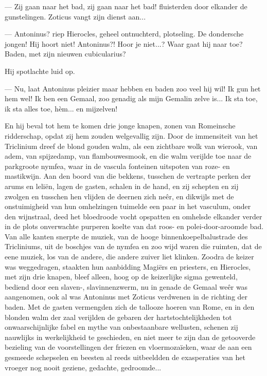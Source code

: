 \documentclass[a4paper, 12pt, oneside, dutch]{article}
\begin{document}
--- Zij gaan naar het bad, zij gaan naar het bad! fluisterden door elkander de gunstelingen. Zoticus vangt zijn dienst aan...

--- Antoninus? riep Hierocles, geheel ontnuchterd, plotseling. De dondersche jongen! Hij hoort niet! Antoninus?! Hoor je niet...? Waar gaat hij naar toe? Baden, met zijn nieuwen cubicularius?

Hij spotlachte luid op.

--- Nu, laat Antoninus pleizier maar hebben en baden zoo veel hij wil! Ik gun het hem wel! Ik ben een Gemaal, zoo genadig als mijn Gemalin zelve is... Ik sta toe, ik sta alles toe, hèm... en mijzelven!

En hij beval tot hem te komen drie jonge knapen, zonen van Romeinsche ridderschap, opdat zij hem zouden welgevallig zijn. Door de immensiteit van het Triclinium dreef de blond gouden walm, als een zichtbare wolk van wierook, van adem, van spijzedamp, van flambouwesmook, en die walm verijlde toe naar de parkgroote nymfea, waar in de vascula fonteinen uitspoten van roze- en mastikwijn. Aan den boord van die bekkens, tusschen de vertrapte perken der arums en leliën, lagen de gasten, schalen in de hand, en zij schepten en zij zwolgen en tusschen hen vlijden de deernen zich neêr, en dikwijls met de onstuimigheid van hun omhelzingen tuimelde een paar in het vasculum, onder den wijnstraal, deed het bloedroode vocht opspatten en omhelsde elkander verder in de plots onverwachte purperen koelte van dat roos- en polei-door-aroomde bad. Van alle kanten snerpte de muziek, van de hooge binnenkoepelbalustrade des Tricliniums, uit de boschjes van de nymfea en zoo wijd waren die ruimten, dat de eene muziek, los van de andere, die andere zuiver liet klinken. Zoodra de keizer was weggedragen, staakten hun aanbidding Magiërs en priesters, en Hierocles, met zijn drie knapen, bleef alleen, hoog op de keizerlijke sigma gewenteld, bediend door een slaven-, slavinnenzwerm, nu in genade de Gemaal weêr was aangenomen, ook al was Antoninus met Zoticus verdwenen in de richting der baden. Met de gasten vermengden zich de tallooze hoeren van Rome, en in den blonden walm der zaal verijlden de gebaren der hartstochtelijkheden tot onwaarschijnlijke fabel en mythe van onbestaanbare wellusten, schenen zij nauwlijks in werkelijkheid te geschieden, en niet meer te zijn dan de getooverde bezieling van de voorstellingen der friezen en vloermozaïeken, waar de aan een gesmeede schepselen en beesten al reeds uitbeeldden de exasperaties van het vroeger nog nooit geziene, gedachte, gedroomde...
\end{document}
